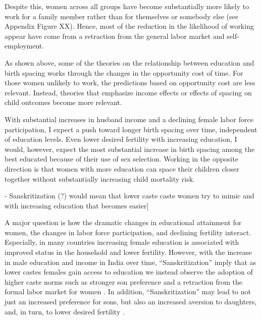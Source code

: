 Despite this, women across all groups have become substantially more likely to 
work for a family member rather than for themselves or somebody else
(see Appendix Figure XX).
Hence, most of the reduction in the likelihood of working appear have come from 
a retraction from the general labor market and self-employment.

As shown above, some of the theories on the relationship between education and birth 
spacing works through the changes in the opportunity cost of time. 
For those women unlikely to work, the predictions based on opportunity cost are 
less relevant. 
Instead, theories that emphasize income effects or effects of spacing on child
outcomes become more relevant. 

With substantial increases in husband income and a declining female labor force 
participation, I expect a push toward longer birth spacing over time, independent
of education levels.
Even lower desired fertility with increasing education, I would, however, expect
the most substantial increase in birth spacing among the best educated because
of their use of sex selection.
Working in the opposite direction is that women with more education can space
their children closer together without substantially increasing child mortality risk.


- Sanskritization (?) would mean that lower caste caste women try to mimic 
  and with increasing education that becomes easier]

A major question is how the dramatic changes in educational attainment for women, the
changes in labor force participation, and declining fertility interact.
Especially, in many countries increasing female education is associated with 
improved status in the household and lower fertility.
However, with the increase in male education and income in India over time, 
``Sanskritization'' imply that as lower castes females gain access to education we 
instead observe the adoption of higher caste norms such as stronger son preference
and a retraction from the formal labor market for women 
\citep{Srinivas1956,Chen1995,Abraham2013,Chatterjee2018}.
In addition, ``Sanskritization'' may lead to not just an increased preference for sons,
but also an increased aversion to daughters, and, in turn, to lower desired fertility
\citep{Borooah2004}.


